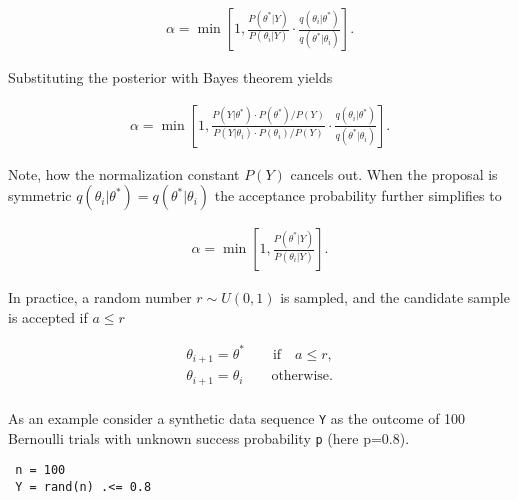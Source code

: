 \begin{equation*}
\begin{split}\alpha = \min\left[1,\frac{P(\theta^*|Y)}{P(\theta_i|Y)}\cdot{}\frac{q(\theta_i|\theta^*)}{q(\theta^*|\theta_i)}\right].\end{split}\end{equation*}


Substituting the posterior with Bayes{\textquotesingle} theorem yields



\begin{equation*}
\begin{split}\alpha = \min\left[1,\frac{P(Y|\theta^*)\cdot{}P(\theta^*)/P(Y)}{P(Y|\theta_i)\cdot{}P(\theta_i)/P(Y)}\cdot{}\frac{q(\theta_i|\theta^*)}{q(\theta^*|\theta_i)}\right].\end{split}\end{equation*}


Note, how the normalization constant \(P(Y)\) cancels out. When the proposal is symmetric \(q(\theta_i|\theta^*) = q(\theta^*|\theta_i)\) the acceptance probability further simplifies to



\begin{equation*}
\begin{split}\alpha = \min\left[1,\frac{P(\theta^*|Y)}{P(\theta_i|Y)}\right].\end{split}\end{equation*}


In practice, a random number \(r \sim U(0,1)\) is sampled, and the candidate sample is accepted if \(a \leq r\)



\begin{equation*}
\begin{split}\theta_{i + 1} = \theta^*     \qquad  \text{if} \quad a \leq r,\\
\theta_{i + 1} = \theta_{i}   \qquad  \text{otherwise.} \\\end{split}\end{equation*}


As an example consider a synthetic data sequence \texttt{Y} as the outcome of 100 Bernoulli trials with unknown success probability \texttt{p} (here p=0.8).




\begin{verbatim}
 n = 100
 Y = rand(n) .<= 0.8
\end{verbatim}



